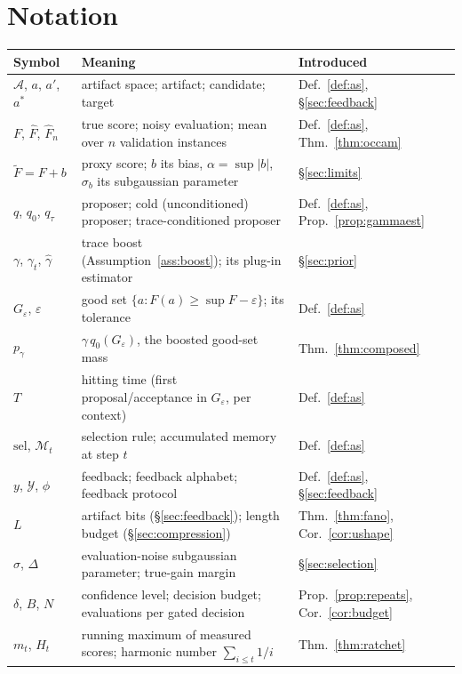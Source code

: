\documentclass{article}
\theoremstyle{plain}
\theoremstyle{definition}
\theoremstyle{remark}
\newcommand{\A}{\mathcal{A}}
\newcommand{\Y}{\mathcal{Y}}
\newcommand{\M}{\mathcal{M}}
\newcommand{\sel}{\mathrm{sel}}
\newcommand{\Fhat}{\widehat{F}}
\newcommand{\Ftil}{\widetilde{F}}
\newcommand{\eps}{\varepsilon}
\newcommand{\pgam}{p_{\gamma}}
\begin{document}
\section{Notation}
\label{app:notation}

\begin{table}[h]
\centering
\small
\begin{tabular}{@{}lll@{}}
\toprule
Symbol & Meaning & Introduced \\
\midrule
$\A$, $a$, $a'$, $a^*$ & artifact space; artifact; candidate; target & Def.~\ref{def:as}, \S\ref{sec:feedback} \\
$F$, $\Fhat$, $\Fhat_n$ & true score; noisy evaluation; mean over $n$ validation instances & Def.~\ref{def:as}, Thm.~\ref{thm:occam} \\
$\Ftil = F + b$ & proxy score; $b$ its bias, $\alpha = \sup|b|$, $\sigma_b$ its subgaussian parameter & \S\ref{sec:limits} \\
$q$, $q_0$, $q_\tau$ & proposer; cold (unconditioned) proposer; trace-conditioned proposer & Def.~\ref{def:as}, Prop.~\ref{prop:gammaest} \\
$\gamma$, $\gamma_t$, $\hat\gamma$ & trace boost (Assumption~\ref{ass:boost}); its plug-in estimator & \S\ref{sec:prior} \\
$G_\eps$, $\eps$ & good set $\{a : F(a) \ge \sup F - \eps\}$; its tolerance & Def.~\ref{def:as} \\
$\pgam$ & $\gamma\, q_0(G_\eps)$, the boosted good-set mass & Thm.~\ref{thm:composed} \\
$T$ & hitting time (first proposal/acceptance in $G_\eps$, per context) & Def.~\ref{def:as} \\
$\sel$, $\M_t$ & selection rule; accumulated memory at step $t$ & Def.~\ref{def:as} \\
$y$, $\Y$, $\phi$ & feedback; feedback alphabet; feedback protocol & Def.~\ref{def:as}, \S\ref{sec:feedback} \\
$L$ & artifact bits (\S\ref{sec:feedback}); length budget (\S\ref{sec:compression}) & Thm.~\ref{thm:fano}, Cor.~\ref{cor:ushape} \\
$\sigma$, $\Delta$ & evaluation-noise subgaussian parameter; true-gain margin & \S\ref{sec:selection} \\
$\delta$, $B$, $N$ & confidence level; decision budget; evaluations per gated decision & Prop.~\ref{prop:repeats}, Cor.~\ref{cor:budget} \\
$m_t$, $H_t$ & running maximum of measured scores; harmonic number $\sum_{i\le t} 1/i$ & Thm.~\ref{thm:ratchet} \\

\end{tabular}
\end{table}
\end{document}
